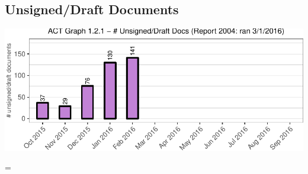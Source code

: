 \documentclass{article}\usepackage[]{graphicx}\usepackage[]{color}
\makeatletter
\def\maxwidth{ %
  \ifdim\Gin@nat@width>\linewidth
    \linewidth
  \else
    \Gin@nat@width
  \fi
}
\newenvironment{knitrout}{}{} %
\newenvironment{absolutelynopagebreak}
  {\par\nobreak\vfil\penalty0\vfilneg
   \vtop\bgroup}
  {\par\xdef\tpd{\the\prevdepth}\egroup
   \prevdepth=\tpd}
\makeatother
\begin{document}
\begin{absolutelynopagebreak}
\subsection{Unsigned/Draft Documents}
\begin{knitrout}
\color{fgcolor}
\includegraphics[width=\maxwidth]{figure/ACT_p_unsign-1} 

\end{knitrout}
\end{absolutelynopagebreak}



\end{document}
